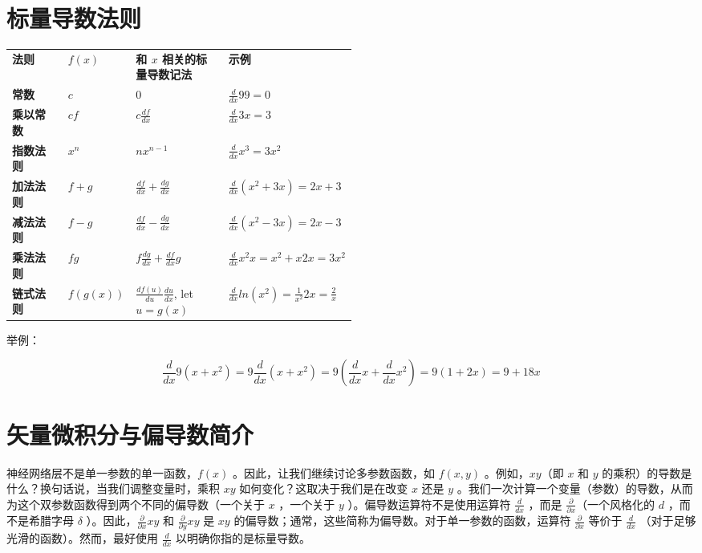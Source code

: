 \documentclass{ctexart}
\begin{document}
\tableofcontents

\section{标量导数法则}

\begin{tabular}{p{0.20\linewidth}lp{0.30\linewidth}l}
{\bf 法则}&{\bf $f(x)$}&{\bf 和 $x$ 相关的标量导数记法}&{\bf 示例}\\

{\bf 常数}&$c$&$0$&$\frac{d}{dx}99 = 0$\\
{\bf 乘以常数}&$cf$&$c \frac{df}{dx}$&$\frac{d}{dx}3x = 3$\\
{\bf 指数法则}&$x^n$&$nx^{n-1}$&$\frac{d}{dx}x^3 = 3x^2$\\
{\bf 加法法则}&$f + g$&$\frac{df}{dx} + \frac{dg}{dx}$&$\frac{d}{dx} (x^2 + 3x) = 2x + 3$\\
{\bf 减法法则}&$f - g$&$\frac{df}{dx} - \frac{dg}{dx}$&$\frac{d}{dx}(x^2 - 3x) = 2x - 3$\\
{\bf 乘法法则}&$fg$&$f \frac{dg}{dx} + \frac{df}{dx} g$&$\frac{d}{dx}x^2x = x^2 + x2x = 3x^2$\\
{\bf 链式法则}&$f(g(x))$&$\frac{df(u)}{du}\frac{du}{dx}$,  let $u=g(x)$&$\frac{d}{dx} ln(x^2) = \frac{1}{x^2}2x = \frac{2}{x}$\\

\end{tabular}

举例：

\[
\frac{d}{dx} 9(x + x^2) = 9 \frac{d}{dx}(x + x^2) = 9 (\frac{d}{dx}x + \frac{d}{dx}x^2) = 9(1 + 2x) = 9 + 18x
\]

\section{矢量微积分与偏导数简介}


神经网络层不是单一参数的单一函数，$f(x)$ 。因此，让我们继续讨论多参数函数，如 $f(x, y)$ 。例如，$xy$（即 $x$ 和 $y$ 的乘积）的导数是什么？换句话说，当我们调整变量时，乘积 $xy$ 如何变化？这取决于我们是在改变 $x$ 还是 $y$ 。我们一次计算一个变量（参数）的导数，从而为这个双参数函数得到两个不同的偏导数（一个关于 $x$ ，一个关于 $y$ ）。偏导数运算符不是使用运算符 $\frac{d}{dx}$ ，而是 $\frac{\partial}{\partial x}$（一个风格化的 $d$ ，而不是希腊字母 $\delta$ ）。因此，$\frac{\partial}{\partial x}xy$ 和 $\frac{\partial}{\partial y}xy$ 是 $xy$ 的偏导数；通常，这些简称为偏导数。对于单一参数的函数，运算符 $\frac{\partial}{\partial x}$ 等价于 $\frac{d}{dx}$ （对于足够光滑的函数）。然而，最好使用 $\frac{d}{dx}$ 以明确你指的是标量导数。
\end{document}
